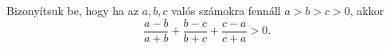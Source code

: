 Bizonyítsuk be, hogy ha az $a,b,c$ valós számokra fennáll $a>b>c>0$, akkor
$$
\frac{a-b}{a+b}+\frac{b-c}{b+c}+\frac{c-a}{c+a}>0.
$$
